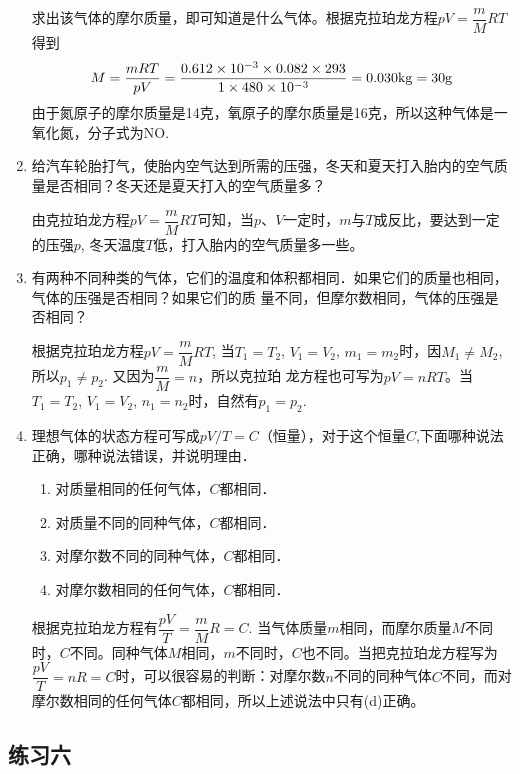 \begin{enumerate}
\begin{solution}
         求出该气体的摩尔质量，即可知道是什么气体。根据克拉珀龙方程$pV=\dfrac{m}{M}RT$得到
\[M=\frac{mRT}{pV}=\frac{0.612\times 10^{-3}\times 0.082\times 293}{1\times 480\times 10^{-3}}=0.030{\rm kg}=30{\rm g}\]
由于氮原子的摩尔质量是14克，氧原子的摩尔质量是16克，所以这种气体是一氧化氮，分子式为NO.
\end{solution}
\item 给汽车轮胎打气，使胎内空气达到所需的压强，冬天和夏天打入胎内的空气质量是否相同？冬天还是夏天打入的空气质量多？

\begin{solution}
由克拉珀龙方程$pV=\dfrac{m}{M}RT$可知，当$p$、$V$一定时，$m$与$T$成反比，要达到一定的压强$p$, 冬天温度$T$低，打入胎内的空气质量多一些。
\end{solution}
\item 有两种不同种类的气体，它们的温度和体积都相同．如果它们的质量也相同，气体的压强是否相同？如果它们的质
量不同，但摩尔数相同，气体的压强是否相同？

\begin{solution}
根据克拉珀龙方程$pV=\dfrac{m}{M}RT$, 当$T_1=T_2$, $V_1=V_2$, $m_1=m_2$时，因$M_1\ne M_2$, 所以$p_1\ne p_2$. 又因为$\dfrac{m}{M}=n$，所以克拉珀
龙方程也可写为$pV=nRT$。当$T_1=T_2$, $V_1=V_2$, $n_1=n_2$时，自然有$p_1=p_2$.
\end{solution}
\item 理想气体的状态方程可写成$pV/T=C$（恒量），对于这个恒量$C$,下面哪种说法正确，哪种说法错误，并说明理由．
\begin{enumerate}
\item 对质量相同的任何气体，$C$都相同．\item 对质量不同的同种气体，$C$都相同．	\item 对摩尔数不同的同种气体，$C$都相同．\item 对摩尔数相同的任何气体，$C$都相同．
\end{enumerate}

\begin{solution}
根据克拉珀龙方程有$\dfrac{pV}{T}=\dfrac{m}{M}R=C$. 当气体质量$m$相同，而摩尔质量$M$不同时，$C$不同。同种气体$M$相同，$m$不同时，$C$也不同。当把克拉珀龙方程写为$\dfrac{pV}{T}=nR=C$时，可以很容易的判断：对摩尔数$n$不同的同种气体$C$不同，而对摩尔数相同的任何气体$C$都相同，所以上述说法中只有(d)正确。
\end{solution}
\end{enumerate}

\subsection{练习六}

